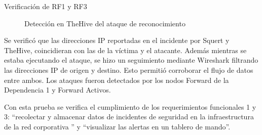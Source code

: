 \begin{section}{Verificación de RF1 y RF3}
\begin{figure}[H]
    \caption{Detección en TheHive del ataque de reconocimiento}
    \label{fig:thehive-nmap}
    \end{figure}
    \FloatBarrier
    Se verificó que las direcciones IP reportadas en el incidente por Squert y TheHive, coincidieran con las de la víctima y el atacante. Además mientras se estaba ejecutando el ataque, se hizo un seguimiento mediante Wireshark \cite{wireshark} filtrando las direcciones IP de origen y destino. Esto permitió corroborar el flujo de datos entre ambos.
    Los ataques fueron detectados por los nodos Forward de la Dependencia 1 y Forward Activos. \par
    Con esta prueba se verifica el cumplimiento de los requerimientos funcionales 1 y 3: “recolectar y almacenar datos de incidentes de seguridad en la infraestructura de la red corporativa ” y “visualizar las alertas en un tablero de mando”.\par
    \end{section} 
    
